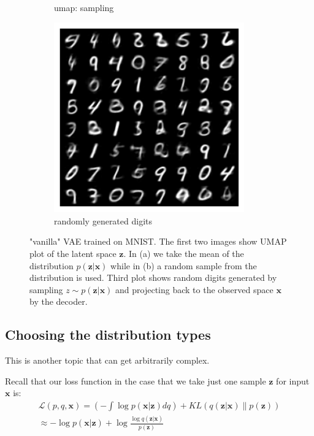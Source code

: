 \documentclass[11pt, a4paper]{report}
\theoremstyle{plain}
\theoremstyle{definition}
\theoremstyle{remark}
\newcommand{\x}{\mathbf{x}}
\newcommand{\z}{\mathbf{z}}
\newcommand{\LL}{\mathcal{L}}
\begin{document}
\begin{figure}[!h]
\begin{framed}
\begin{subfigure}[t]{0.3\textwidth}
\caption{umap: sampling}
\label{fig:vaeumapsamples}
\end{subfigure}
\begin{subfigure}[t]{0.3\textwidth}
\includegraphics[width=0.9\textwidth]{images/vae.generation.mnist.sampling.png}
\caption{randomly generated digits}
\label{fig:vaegen}
\end{subfigure}
\caption{"vanilla" VAE trained on MNIST. The first two images show 
UMAP plot of the latent space $\z$.
In (a) we take the mean of the distribution $p(\z | \x)$ while in (b)
a random sample from the distribution is used.
Third plot shows random digits generated by sampling $z \sim p(\z | \x)$
and projecting back to the observed space $\x$ by the decoder.}
\label{fig:vaeumap}
\end{framed}
\end{figure}


\subsection{Choosing the distribution types}
This is another topic that can get arbitrarily complex.

Recall that our loss function in the case that we take just one sample $\z$ for input $\x$
is:
\begin{equation}
\label{eq:vanillavaeloss}
\begin{aligned}
\LL(p,q,\x) 
= (-\int \log p (\x | \z)dq) + KL(q(\z | \x) \| p(\z)) \\
\approx -\log p (\x | \z) + \log \frac{\log q(\z | \x)}{p(\z)}
\end{aligned}
\end{equation}
\end{document}
